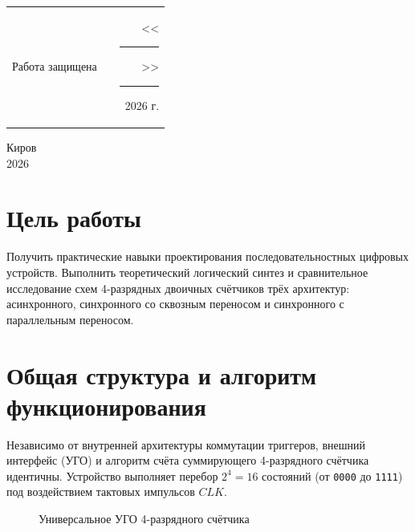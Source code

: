 \documentclass[oneside,a4paper,14pt]{extarticle}
\begin{document}
\noindent
\begin{tabular}{lp{58mm}r}
  Работа защищена &  & \hspace{8mm}<<\rule[-1mm]{8mm}{0.10mm}\/>>\rule[-1mm]{38mm}{0.10mm}\ 2026 г.
\end{tabular}
\vfill

\begin{center}
  Киров\\
  2026
\end{center}

\newpage\thispagestyle{plain}

\section{Цель работы}
Получить практические навыки проектирования последовательностных цифровых устройств. Выполнить теоретический логический синтез и сравнительное исследование схем 4-разрядных двоичных счётчиков трёх архитектур: асинхронного, синхронного со сквозным переносом и синхронного с параллельным переносом.

\section{Общая структура и алгоритм функционирования}
Независимо от внутренней архитектуры коммутации триггеров, внешний интерфейс (УГО) и алгоритм счёта суммирующего 4-разрядного счётчика идентичны. Устройство выполняет перебор $2^4 = 16$ состояний (от \texttt{0000} до \texttt{1111}) под воздействием тактовых импульсов $CLK$.

\begin{figure}[H]
  \centering
  \caption{Универсальное УГО 4-разрядного счётчика}
\end{figure}
\end{document}
